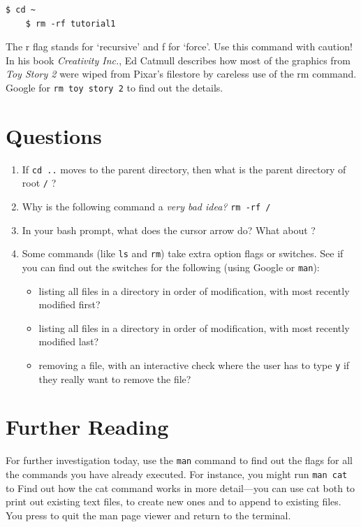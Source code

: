 \documentclass{article}
\begin{document}
\begin{lstlisting}[style=BashInputStyle]
    $ cd ~
    $ rm -rf tutorial1
\end{lstlisting}

The r flag stands for `recursive' and f for `force'. Use this command with caution! In his book \textit{Creativity Inc.}, Ed Catmull describes how most of the graphics from \textit{Toy Story 2} were wiped from Pixar's filestore by careless use of the rm command. Google for \texttt{rm toy story 2} to find out the details.

\section*{Questions}

\begin{enumerate}
\item If \texttt{cd ..} moves to the parent directory, then what is the parent directory of root \texttt{/} ?
\item Why is the following command a \emph{very bad idea?} \texttt{rm -rf /}
\item In your bash prompt, what does the \keys{\arrowkeyup}  cursor arrow do? What about \keys{\arrowkeydown}?
\item Some commands (like \texttt{ls} and \texttt{rm}) take extra option flags or switches. See if you can find out the switches for the following (using Google or \texttt{man}):
  \begin{itemize}
  \item listing all files in a directory in order of modification, with most recently modified first?
  \item listing all files in a directory in order of modification, with most recently modified last?
  \item removing a file, with an interactive check where the user has to type \texttt{y} if they really want to remove the file?
  \end{itemize}
\end{enumerate}


\section*{Further Reading}

For further investigation today, use the \texttt{man} command to find out 
the flags for all the commands you have already executed.
For instance, you might run \texttt{man cat} to Find out how the cat command works in more detail---you can use cat both to print out existing text files, to create new ones and to append to existing files.
You press  to quit the man page viewer and return to the terminal.
\end{document}
